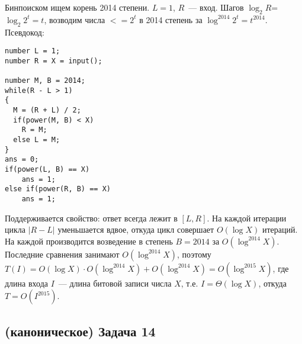 \documentclass[a4paper]{article}
\begin{document}
Бинпоиском ищем корень 2014 степени. $L=1$, $R$~--- вход. Шагов $\log_{2} R$=$\log_2 2^t=t$, возводим числа $<= 2^t$ в 2014 степень за $\log^{2014} 2^t=t^{2014}$. Псевдокод:\newline
\begin{lstlisting}
number L = 1;
number R = X = input();

number M, B = 2014;
while(R - L > 1)
{
  M = (R + L) / 2;
  if(power(M, B) < X)
    R = M;
  else L = M;
}
ans = 0;
if(power(L, B) == X)
	ans = 1;
else if(power(R, B) == X)
	ans = 1;
\end{lstlisting}
Поддерживается свойство: ответ всегда лежит в $[L,R]$. На каждой итерации цикла $|R-L|$ уменьшается вдвое, откуда цикл совершает $O(\log X)$ итераций. На каждой производится возведение в степень $B=2014$ за $O(\log^{2014} X)$. Последние сравнения занимают $O(\log^{2014}X)$, поэтому $T(I)=O(\log X)\cdot O(\log^{2014}X)+O(\log^{2014}X)=O(\log^{2015} X)$, где длина входа $I$~--- длина битовой записи числа $X$, т.е. $I=\Theta(\log X)$, откуда $T=O(I^{2015})$.
\subsection*{(каноническое) Задача 14}
\end{document}
